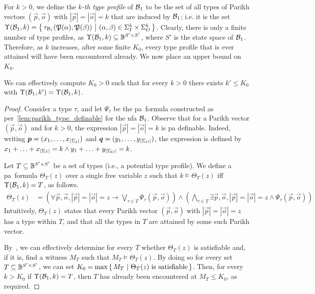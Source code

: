 For $k>0$, we define the \emph{$k$-th type profile} of $\mathcal{B}_1$ to be the set of all types of Parikh vectors $(\vec{p},\vec{o})$ with $|\vec{p}|=|\vec{o}|=k$ that are induced by $\mathcal{B}_1$; i.e. it is the set $\Upsilon(\mathcal{B}_1,k)=\left\{\,\tau_{\mathcal{B}_1}(\mathfrak{P}(\alpha),\mathfrak{P}(\beta))\ \middle|\ (\alpha,\beta)\in \Sigma_{I}^k \times \Sigma_{O}^k\,\right\}$. Clearly, there is only a finite number of type profiles, as $\Upsilon(\mathcal{B}_1,k)\subseteq \mathbb{B}^{S'\times S'}$, where $S'$ is the state space of $\mathcal{B}_1$. Therefore, as $k$ increases, after some finite $K_0$, every type profile that is ever attained will have been encountered already. We now place an upper bound on $K_0$.

\begin{lemma}
	\label{lem:type_profile_bound}
	We can effectively compute $K_0>0$ such that for every $k>0$ there exists $k'\le K_0$ with $\Upsilon(\mathcal{B}_1,k')=\Upsilon(\mathcal{B}_1,k)$.
	\end{lemma}
\begin{proof}
	Consider a type $\tau$, and let $\Psi_\tau$ be the \gls{pa}~formula constructed as per~\cref{lem:parikh_type_definable} for the \gls{nfa} $\mathcal{B}_1$. Observe that for a Parikh vector $(\vec{p},\vec{o})$ and for $k>0$, the expression $|\vec{p}|=|\vec{o}|=k$ is \gls{pa} definable. Indeed, writing $\boldsymbol{p}=(x_1,\ldots,x_{|\Sigma_{I}|})$ and $\boldsymbol{q}=(y_1,\ldots,y_{|\Sigma_{O}|})$, the expression is defined by $x_1+\ldots+x_{|\Sigma_{I}|}=k \wedge y_1+\ldots+y_{|\Sigma_{O}|}=k$.
	
	Let $T\subseteq \mathbb{B}^{S'\times S'}$ be a set of types (i.e., a potential type profile). We define a \gls{pa}~formula $\Theta_T(z)$ over a single free variable $z$ such that $k\models \Theta_T(z)$ iff $\Upsilon(\mathcal{B}_1,k)=T$, as follows.
	\begin{align*}
		\Theta_T(z)&=\left(\forall \vec{p},\vec{o}, |\vec{p}|=|\vec{o}|=z \to \bigvee_{\tau\in T}\Psi_\tau(\vec{p},\vec{o})\right)
		\wedge \left(\bigwedge_{\tau\in T}\exists \vec{p},\vec{o}, |\vec{p}|=|\vec{o}|=z \wedge \Psi_\tau(\vec{p},\vec{o})\right)
	\end{align*}
Intuitively, $\Theta_T(z)$ states that every Parikh vector $(\vec{p},\vec{o})$ with $|\vec{p}|=|\vec{o}|=z$ has a type within $T$, and that all the types in $T$ are attained by some such Parikh vector.

By~\cite{Fischer1974,Borosh1976}, we can effectively determine for every $T$ whether $\Theta_T(z)$ is satisfiable and, if it is, find a witness $M_T$ such that $M_T\models \Theta_T(z)$. By doing so for every set $T\subseteq \mathbb{B}^{S'\times S'}$, we can set $K_0=\max\left\{\,M_T\ \middle|\ \Theta_T(z) \text{ is satisfiable}\,\right\}$. Then, for every $k>K_0$ if $\Upsilon(\mathcal{B}_1,k)=T$, then $T$ has already been encountered at $M_T\le K_0$, as required. 
\end{proof}

